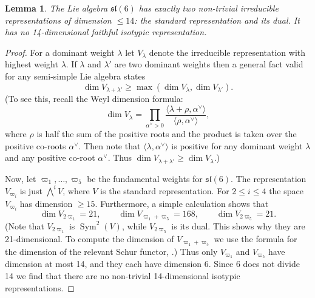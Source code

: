 \documentclass{amsart}
\newtheorem{lemma}[theorem]{Lemma}
\theoremstyle{definition}
\theoremstyle{remark}
\DeclareMathOperator{\Sym}{Sym}
\let\mf\mathfrak
\begin{document}
\begin{lemma}
\label{lem:sl6}
The Lie algebra $\mf{sl}(6)$ has exactly two non-trivial irreducible
representations of dimension $\le 14$:  the standard representation and its
dual.  It has no 14-dimensional faithful isotypic representation.
\end{lemma}

\begin{proof}
For a dominant weight $\lambda$ let $V_{\lambda}$ denote the irreducible
representation with highest weight $\lambda$.  If $\lambda$ and $\lambda'$
are two dominant weights then a general fact valid for any semi-simple
Lie algebra states
\begin{displaymath}
\dim{V_{\lambda+\lambda'}} \ge \max(\dim{V_{\lambda}}, \dim{V_{\lambda'}}).
\end{displaymath}
(To see this, recall the Weyl dimension formula:
\begin{displaymath}
\dim{V_{\lambda}}=\prod_{\alpha^{\vee}>0}
\frac{\langle \lambda+\rho, \alpha^{\vee} \rangle}{\langle \rho,
\alpha^{\vee} \rangle},
\end{displaymath}
where $\rho$ is half the sum of the positive roots and the product is taken
over the positive co-roots $\alpha^{\vee}$.  Then note that $\langle
\lambda, \alpha^{\vee} \rangle$ is positive for any dominant weight $\lambda$
and any positive co-root $\alpha^{\vee}$.  Thus $\dim{V_{\lambda+\lambda'}} \ge
\dim{V_{\lambda}}$.)

Now, let $\varpi_1, \ldots, \varpi_5$ be the fundamental weights for
$\mf{sl}(6)$.  The representation $V_{\varpi_i}$ is just $\bigwedge^i V$,
where $V$ is the standard representation.  For $2 \le i \le 4$ the space
$V_{\varpi_i}$ has dimension $\ge 15$.  Furthermore, a simple calculation
shows that
\begin{displaymath}
\dim{V_{2 \varpi_1}}=21, \qquad \dim{V_{\varpi_1+\varpi_5}}=168, \qquad
\dim{V_{2 \varpi_5}}=21.
\end{displaymath}
(Note that $V_{2 \varpi_1}$ is $\Sym^2(V)$, while $V_{2 \varpi_5}$ is its
dual.  This shows why they are 21-dimensional.  To compute the dimension of
$V_{\varpi_1+\varpi_5}$ we use the formula for the dimension of the relevant
Schur functor, \cite[Ex.~6.4]{FH}.) Thus only $V_{\varpi_1}$
and $V_{\varpi_5}$ have dimension at most 14, and
they each have dimension 6.  Since 6 does not divide 14 we find that there are
no non-trivial 14-dimensional isotypic representations.
\end{proof}
\end{document}
